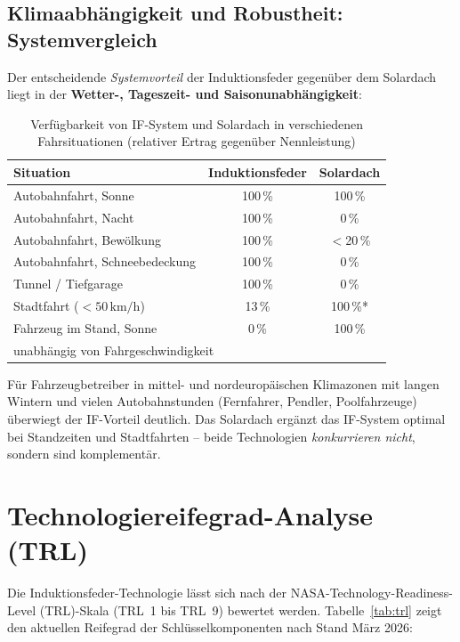 ﻿\documentclass[12pt, a4paper]{report}
\theoremstyle{definition}
\theoremstyle{remark}
\begin{document}
\subsection{Klimaabhängigkeit und Robustheit: Systemvergleich}

Der entscheidende \emph{Systemvorteil} der Induktionsfeder gegenüber dem
Solardach liegt in der \textbf{Wetter-, Tageszeit- und Saisonunabhängigkeit}:

\begin{table}[H]
  \centering
  \caption{Verfügbarkeit von IF-System und Solardach in verschiedenen
           Fahrsituationen (relativer Ertrag gegenüber Nennleistung)}
  \label{tab:verfuegbarkeit}
  \begin{tabular}{lcc}
    \toprule
    Situation & Induktionsfeder & Solardach \\
    \midrule
    Autobahnfahrt, Sonne          & 100\,\%        & 100\,\% \\
    Autobahnfahrt, Nacht          & 100\,\%        & 0\,\% \\
    Autobahnfahrt, Bewölkung      & 100\,\%        & $<$20\,\% \\
    Autobahnfahrt, Schneebedeckung& 100\,\%        & 0\,\% \\
    Tunnel / Tiefgarage           & 100\,\%        & 0\,\% \\
    Stadtfahrt ($< 50\,\text{km/h}$) & 13\,\%     & 100\,\%* \\
    Fahrzeug im Stand, Sonne      & 0\,\%          & 100\,\% \\
    \bottomrule
    \multicolumn{3}{l}{\footnotesize *unabhängig von Fahrgeschwindigkeit}
  \end{tabular}
\end{table}

Für Fahrzeugbetreiber in mittel- und nordeuropäischen Klimazonen mit langen
Wintern und vielen Autobahnstunden (Fernfahrer, Pendler, Poolfahrzeuge)
überwiegt der IF-Vorteil deutlich. Das Solardach ergänzt das IF-System
optimal bei Standzeiten und Stadtfahrten -- beide Technologien
\emph{konkurrieren nicht}, sondern sind komplementär.

\section{Technologiereifegrad-Analyse (TRL)}
\label{sec:trl}

Die Induktionsfeder-Technologie lässt sich nach der NASA-Technology-Readiness-Level
(TRL)-Skala (TRL~1 bis TRL~9) bewertet werden. Tabelle~\ref{tab:trl} zeigt
den aktuellen Reifegrad der Schlüsselkomponenten nach Stand März 2026:
\end{document}
